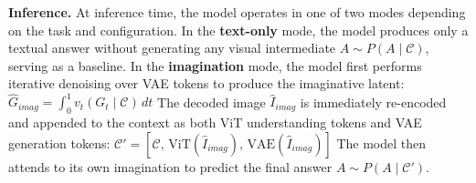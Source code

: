 \noindent\textbf{Inference.} 
At inference time, the model operates in one of two modes depending on the task and configuration.
In the \textbf{text-only} mode, the model produces only a textual answer without generating any visual intermediate $A \sim P(A \mid \mathcal{C})$, serving as a baseline.
In the \textbf{imagination} mode, the model first performs iterative denoising over VAE tokens to produce the imaginative latent:
$\hat{G}_{imag} = \int_{0}^{1} v_t(G_t \mid \mathcal{C}) \, dt$
The decoded image $\hat{I}_{imag}$ is immediately re-encoded and appended to the context as both ViT understanding tokens and VAE generation tokens:
$\mathcal{C}' = \left[\mathcal{C},\, \text{ViT}(\hat{I}_{imag}),\, \text{VAE}(\hat{I}_{imag})\right]$
The model then attends to its own imagination to predict the final answer $A \sim P(A \mid \mathcal{C}')$.













